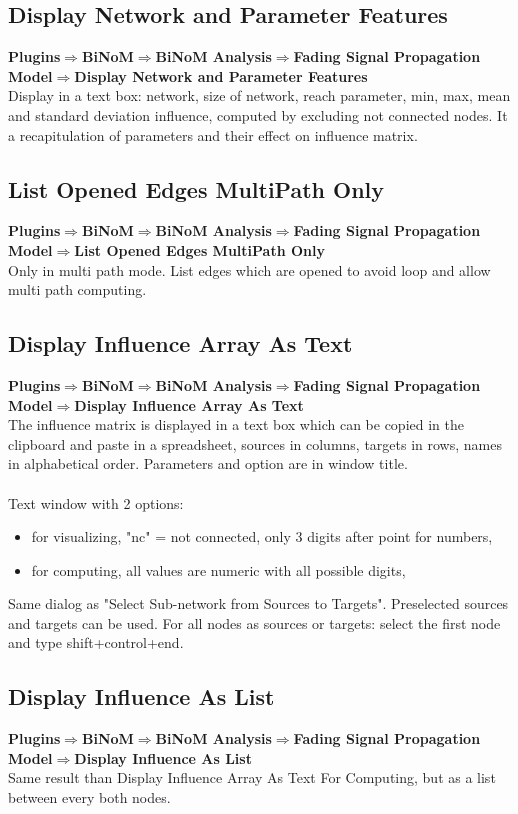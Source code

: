 \subsection{Display Network and Parameter Features}
\textbf{Plugins$\Rightarrow$BiNoM$\Rightarrow$BiNoM Analysis$\Rightarrow$Fading Signal Propagation Model$\Rightarrow$Display Network and Parameter Features}\\
Display in a text box: network, size of network, reach parameter, min, max, mean and standard deviation influence, computed by excluding not connected nodes. It a recapitulation of parameters and their effect on influence matrix.

\subsection{List Opened Edges MultiPath Only}
\textbf{Plugins$\Rightarrow$BiNoM$\Rightarrow$BiNoM Analysis$\Rightarrow$Fading Signal Propagation Model$\Rightarrow$List Opened Edges MultiPath Only}\\
Only in multi path mode. List edges which are opened to avoid loop and allow multi path computing.

\subsection{Display Influence Array As Text}
\textbf{Plugins$\Rightarrow$BiNoM$\Rightarrow$BiNoM Analysis$\Rightarrow$Fading Signal Propagation Model$\Rightarrow$Display Influence Array As Text}\\
The influence matrix is displayed in a text box which can be copied in the clipboard and paste in a spreadsheet, sources in columns, targets in rows, names in alphabetical order. Parameters and option are in window title.\\\\
Text window with 2 options: 
\begin{itemize}
\item for visualizing, "nc" = not connected, only 3 digits after point for numbers,
\item for computing,  all values are numeric with all possible digits,
\end{itemize}
Same dialog as "Select Sub-network from Sources to Targets".  Preselected sources and targets can be used.  For all nodes as sources or targets: select the first node and type shift+control+end.

\subsection{Display Influence As List}
\textbf{Plugins$\Rightarrow$BiNoM$\Rightarrow$BiNoM Analysis$\Rightarrow$Fading Signal Propagation Model$\Rightarrow$Display Influence As List}\\
Same result than Display Influence Array As Text For Computing, but as a list between every both nodes.


